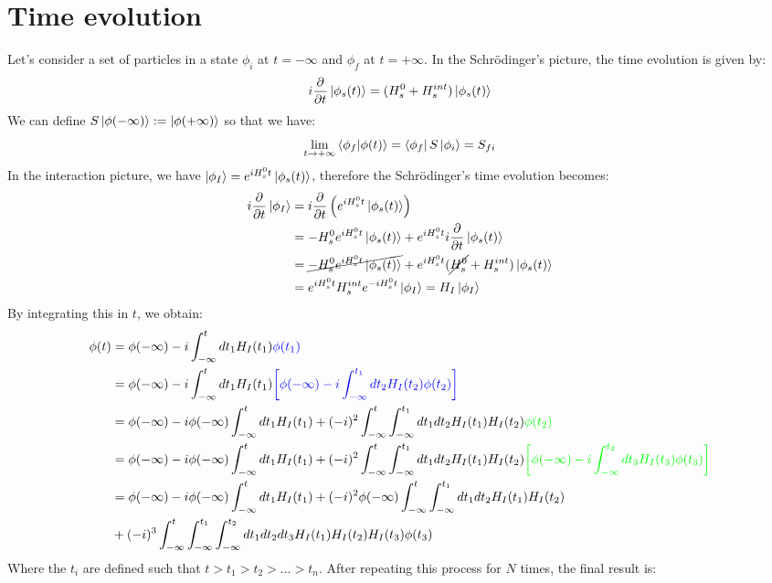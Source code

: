 \documentclass[../main.tex]{subfiles}
\begin{document}
\section{Time evolution}
Let's consider a set of particles in a state $\phi_i$ at $t=-\infty$ and $\phi_f$ at $t=+\infty$. In the Schr\"odinger's picture, the time evolution is given by:
\[
i\frac{\partial}{\partial t}\ket{\phi_s(t)}=(H_s^0+H_s^{int})\ket{\phi_s(t)}
\]
We can define $S\ket{\phi(-\infty)}:=\ket{\phi(+\infty)}$ so that we have:
\[
\lim_{t\to+\infty}\bra{\phi_f}\ket{\phi(t)}=\bra{\phi_f}S\ket{\phi_i}=S_{fi}
\]
In the interaction picture, we have $\ket{\phi_I}=e^{iH_s^0t}\ket{\phi_s(t)}$, therefore the Schr\"odinger's time evolution becomes:
\begin{align*}
i\frac{\partial}{\partial t}\ket{\phi_I}&=i\frac{\partial}{\partial t}\left(e^{iH_s^0t}\ket{\phi_s(t)}\right)\\
&=-H_s^0e^{iH_s^0t}\ket{\phi_s(t)}+e^{iH_s^0t}i\frac{\partial}{\partial t}\ket{\phi_s(t)}\\
&=\cancel{-H_s^0e^{iH_s^0t}\ket{\phi_s(t)}}+e^{iH_s^0t}(\cancel{H_s^0}+H_s^{int})\ket{\phi_s(t)}\\
&=e^{iH_s^0t}H_s^{int}e^{-iH_s^0t}\ket{\phi_I}=H_I\ket{\phi_I}
\end{align*}
By integrating this in $t$, we obtain:
\begin{align*}
\phi(t)&=\phi(-\infty)-i\int_{-\infty}^tdt_1H_I(t_1){\color{blue}\phi(t_1)}\\
&=\phi(-\infty)-i\int_{-\infty}^tdt_1H_I(t_1){\color{blue}\left[\phi(-\infty)-i\int_{-\infty}^{t_1}dt_2H_I(t_2)\phi(t_2)\right]}\\
&=\phi(-\infty)-i\phi(-\infty)\int_{-\infty}^tdt_1H_I(t_1)+(-i)^2\int_{-\infty}^t\int_{-\infty}^{t_1}dt_1dt_2H_I(t_1)H_I(t_2){\color{green}\phi(t_2)}\\
&=\phi(-\infty)-i\phi(-\infty)\int_{-\infty}^tdt_1H_I(t_1)+(-i)^2\int_{-\infty}^t\int_{-\infty}^{t_1}dt_1dt_2H_I(t_1)H_I(t_2){\color{green}\left[\phi(-\infty)-i\int_{-\infty}^{t_2}dt_3H_I(t_3)\phi(t_3)\right]}\\
&=\phi(-\infty)-i\phi(-\infty)\int_{-\infty}^tdt_1H_I(t_1)+(-i)^2\phi(-\infty)\int_{-\infty}^t\int_{-\infty}^{t_1}dt_1dt_2H_I(t_1)H_I(t_2)\\
&+(-i)^3\int_{-\infty}^{t}\int_{-\infty}^{t_1}\int_{-\infty}^{t_2}dt_1dt_2dt_3H_I(t_1)H_I(t_2)H_I(t_3)\phi(t_3)
\end{align*}
Where the $t_i$ are defined such that $t>t_1>t_2>\dots>t_n$. After repeating this process for $N$ times, the final result is:
\end{document}

